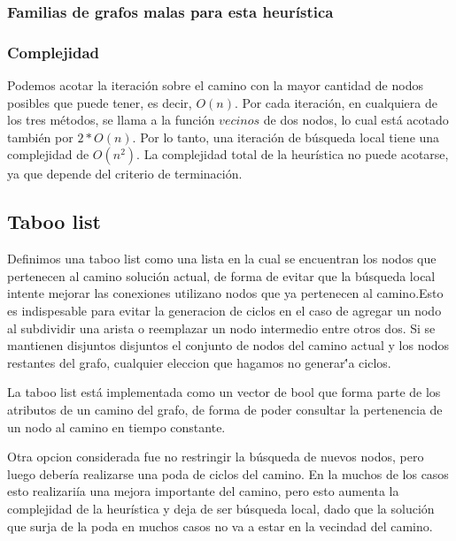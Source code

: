 \subsubsection{Familias de grafos malas para esta heur\'istica}

\subsubsection{Complejidad}

Podemos acotar la iteraci\'on sobre el camino con la mayor cantidad de nodos posibles que puede tener, es decir, $O(n)$. Por cada iteraci\'on, en cualquiera de los tres m\'etodos, se llama a la funci\'on $vecinos$ de dos nodos, lo cual est\'a acotado tambi\'en por $2*O(n)$. Por lo tanto, una iteraci\'on de b\'usqueda local tiene una complejidad de $O(n^2)$. La complejidad total de la heur\'istica no puede acotarse, ya que depende del criterio de terminaci\'on.

\subsection{Taboo list}
  Definimos una taboo list como una lista en la cual se encuentran los nodos que pertenecen al camino soluci\'on actual, de forma de evitar que la b\'usqueda local intente mejorar las conexiones utilizano nodos que ya pertenecen al camino.Esto es indispesable para evitar la generacion de ciclos en el caso de agregar un nodo al subdividir una arista o reemplazar un nodo
intermedio entre otros dos. Si se mantienen disjuntos disjuntos el conjunto de nodos del camino actual y los nodos restantes del grafo, cualquier eleccion que hagamos no generar\''a ciclos.

\vspace{2mm}

La taboo list est\'a implementada como un vector de bool que forma parte de los atributos de un camino del grafo, de forma de poder consultar la pertenencia de un nodo al camino en tiempo constante.

\vspace{2mm}

	Otra opcion considerada fue no restringir la b\'usqueda de nuevos nodos, pero luego deber\'ia realizarse una poda de ciclos del camino. En la muchos de los casos esto realizari\'ia una mejora importante del camino, pero esto aumenta la complejidad de la heur\'istica y deja de ser b\'usqueda local, dado que la soluci\'on que surja de la poda en muchos casos no va a estar en la vecindad del camino.
 